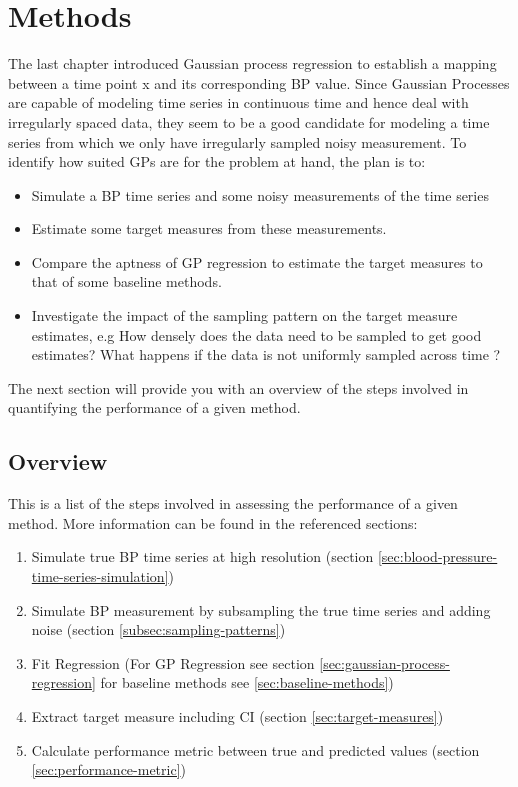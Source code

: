 \usepackage{texab}\chapter{Methods}\label{ch:methods}

The last chapter introduced Gaussian process regression
to establish a mapping between a time point x and its
corresponding BP value.
Since Gaussian Processes are capable of modeling time series in continuous
time and hence deal with irregularly spaced data,
they seem to be a good candidate for modeling a time series from which
we only have irregularly sampled noisy measurement.
To identify how suited GPs are for the problem at hand, the plan is to:
\begin{itemize}
    \item Simulate a BP time series and some noisy measurements of the time series
    \item Estimate some target measures from these measurements.
    \item Compare the aptness of GP regression to estimate the target measures to that of some baseline methods.
    \item Investigate the impact of the sampling pattern on the target measure estimates, e.g
    How densely does the data need to be sampled to get good estimates?
    What happens if the data is not uniformly sampled across time ?
\end{itemize}

The next section will provide you with an overview of the steps involved
in quantifying the performance of a given method.


\section{Overview}

This is a list of the steps involved in assessing the performance of a given
method. More information can be found in the referenced sections:

\begin{enumerate}
    \item Simulate true BP time series at high resolution (section \ref{sec:blood-pressure-time-series-simulation})
    \item Simulate BP measurement by subsampling the true time series and adding noise (section \ref{subsec:sampling-patterns})
    \item Fit Regression (For GP Regression see section \ref{sec:gaussian-process-regression}
    for baseline methods see \ref{sec:baseline-methods})
    \item Extract target measure including CI (section \ref{sec:target-measures})
    \item Calculate performance metric between true and predicted values (section \ref{sec:performance-metric})
\end{enumerate}

